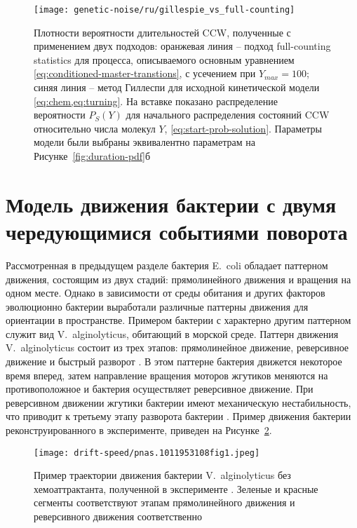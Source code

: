 \begin{figure}[ht]
    \centering
    \texttt{[image: genetic-noise/ru/gillespie\_vs\_full-counting]}
    \caption{
        Плотности вероятности длительностей CCW, полученные с применением двух подходов: оранжевая линия -- подход full-counting statistics для процесса, описываемого основным уравнением \cref{eq:conditioned-master-transtions}, с усечением при $Y_{max} = 100$; синяя линия -- метод Гиллеспи \cite{gillespie_stochastic_2007} для исходной кинетической модели \cref{eq:chem,eq:turning}. На вставке показано распределение вероятности $P_S(Y)$ для начального распределения состояний CCW относительно числа молекул $Y$, \cref{eq:start-prob-solution}. Параметры модели были выбраны эквивалентно параметрам на Рисунке~\cref{fig:duration-pdf}б
    }
    \label{fig:gillespi-vs-direct}
\end{figure}

\section{Модель движения бактерии с двумя чередующимися событиями поворота}\label{sec:ch2/sec2}

Рассмотренная в предыдущем разделе бактерия E.~coli обладает паттерном движения, состоящим из двух стадий: прямолинейного движения и вращения на одном месте. Однако в зависимости от среды обитания и других факторов эволюционно бактерии выработали различные паттерны движения для ориентации в пространстве. Примером бактерии с характерно другим паттерном служит вид V.~alginolyticus, обитающий в морской среде. Паттерн движения V.~alginolyticus состоит из трех этапов: прямолинейное движение, реверсивное движение и быстрый разворот \cite{xie_bacterial_2011}. В этом паттерне бактерия движется некоторое время вперед, затем направление вращения моторов жгутиков меняются на противоположное и бактерия осуществляет реверсивное движение. При реверсивном движении жгутики бактерии имеют механическую нестабильность, что приводит к третьему этапу разворота бактерии \cite{taute_high-throughput_2015}. Пример движения бактерии реконструированного в эксперименте, приведен на Рисунке~\cref{fig:vibrio-trajectories}.

\begin{figure}[ht]
    \centering
    \texttt{[image: drift-speed/pnas.1011953108fig1.jpeg]}
    \caption{
        Пример траектории движения бактерии V.~alginolyticus без хемоаттрактанта, полученной в эксперименте
        \cite{xie_bacterial_2011}. Зеленые и красные сегменты соответствуют этапам прямолинейного движения и реверсивного движения соответственно
    }
    \label{fig:vibrio-trajectories}
\end{figure}

